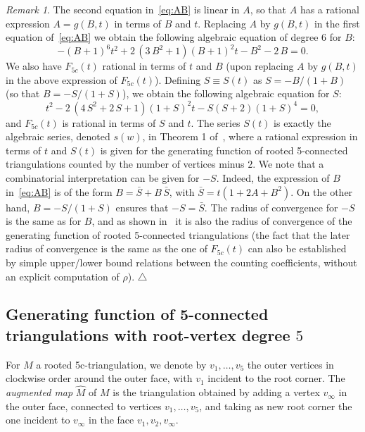 \documentclass[letter]{amsart}
\numberwithin{theo}{section}
\theoremstyle{remark}
\newtheorem{remark}[theo]{Remark}
\def\Ffc{F_{5c}}
\begin{document}
\begin{remark}\label{rk:S}
The second equation in~\eqref{eq:AB} is linear in $A$, so that $A$ has a rational expression $A=g(B,t)$ in terms of $B$ and $t$. Replacing $A$ by $g(B,t)$ in the first equation of~\eqref{eq:AB} we obtain the following algebraic equation of degree $6$ for $B$:
\[
- \left( B+1 \right) ^{6}{t}^{2}+2\, \left( 3\,{B}^{2}+1 \right) 
 \left( B+1 \right) ^{2}t-{B}^{2}-2\,B=0.
\] 
We also have $\Ffc(t)$ rational in terms of $t$ and $B$ (upon replacing $A$ by $g(B,t)$ in the above expression of $\Ffc(t)$). Defining $S\equiv S(t)$ as $S=-B/(1+B)$ (so that $B=-S/(1+S)$), we obtain the following algebraic equation for $S$:
\[
{t}^{2}-2\, \left( 4\,{S}^{2}+2\,S+1 \right) \left( 1+S \right) ^{2
}t-S \left( S+2 \right)  \left( 1+S \right) ^{4}=0,
\]
and $\Ffc(t)$ is rational in terms of $S$ and $t$. The series $S(t)$ is exactly the algebraic series, denoted $s(w)$, in Theorem 1 of~\cite{gao2001}, where a rational expression in terms of $t$ and $S(t)$ is given for the generating function of rooted 5-connected triangulations counted by the number of vertices minus $2$. We note that a combinatorial interpretation can be given for $-S$. Indeed, 
the expression of $B$ in~\eqref{eq:AB}
 is of the form $B=\bar{S}+B\,\bar{S}$, with $\bar{S}=t(1+2A+B^2)$. On the other hand, $B=-S/(1+S)$ ensures that $-S=\bar{S}$. 
 The radius of convergence for $-S$ is the same as for $B$, and as shown in~\cite{gao2001} it is also the radius of convergence of the generating function of rooted 5-connected triangulations 
 (the fact that the later radius of convergence is the same as the one of $\Ffc(t)$ can also be established by simple upper/lower bound relations between the counting coefficients, without an explicit computation of $\rho$).  
\hfill$\triangle$
\end{remark}

\subsection{Generating function of 5-connected triangulations with root-vertex degree $5$}

For $M$ a rooted 5c-triangulation, we denote by $v_1,\ldots,v_5$ the outer vertices in clockwise order around the outer face, with $v_1$ incident to the root corner. The \emph{augmented map} $\hat{M}$ of $M$ is the triangulation obtained by adding a vertex $v_{\infty}$ in the outer face, connected to vertices $v_1,\ldots,v_5$, and taking as new root corner the one incident to $v_{\infty}$ in the face $v_1,v_2,v_{\infty}$. 
\end{document}
